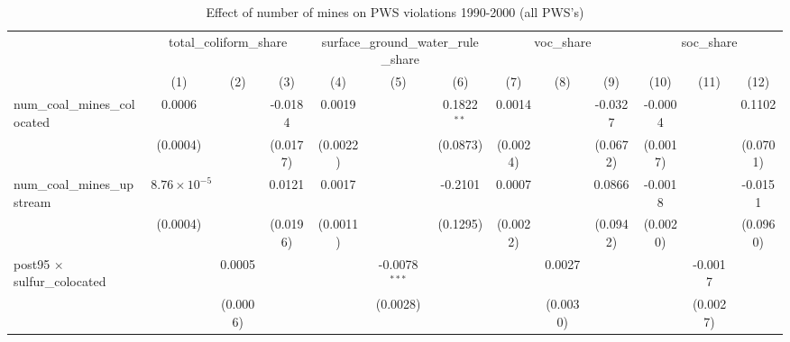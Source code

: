 
\begin{table}[htbp]
   \caption{\label{olsrf2sls_nummine_non_mine_vio_1990to2000allhucs} Effect of number of mines on PWS violations 1990-2000 (all PWS's)}
   \bigskip
   \centering
   \begin{adjustbox}{width = \textwidth, center}
      \begin{tabular}{lcccccccccccc}
         \toprule
          & \multicolumn{3}{c}{total\_coliform\_share} & \multicolumn{3}{c}{surface\_ground\_water\_rule\_share} & \multicolumn{3}{c}{voc\_share} & \multicolumn{3}{c}{soc\_share}\\
                                                            & (1)                   & (2)                   & (3)           & (4)           & (5)             & (6)           & (7)                  & (8)           & (9)           & (10)                  & (11)          & (12)\\  
         \midrule 
         num\_coal\_mines\_colocated                        & 0.0006                &                       & -0.0184       & 0.0019        &                 & 0.1822$^{**}$ & 0.0014               &               & -0.0327       & -0.0004               &               & 0.1102\\   
                                                            & (0.0004)              &                       & (0.0177)      & (0.0022)      &                 & (0.0873)      & (0.0024)             &               & (0.0672)      & (0.0017)              &               & (0.0701)\\   
         num\_coal\_mines\_upstream                         & $8.76\times 10^{-5}$  &                       & 0.0121        & 0.0017        &                 & -0.2101       & 0.0007               &               & 0.0866        & -0.0018               &               & -0.0151\\   
                                                            & (0.0004)              &                       & (0.0196)      & (0.0011)      &                 & (0.1295)      & (0.0022)             &               & (0.0942)      & (0.0020)              &               & (0.0960)\\   
         post95 $\times$ sulfur\_colocated                  &                       & 0.0005                &               &               & -0.0078$^{***}$ &               &                      & 0.0027        &               &                       & -0.0017       &   \\   
                                                            &                       & (0.0006)              &               &               & (0.0028)        &               &                      & (0.0030)      &               &                       & (0.0027)      &   \\   

\end{tabular}
\end{adjustbox}
\end{table}
